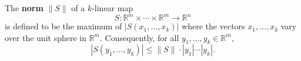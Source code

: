 The \textbf{norm} $\|S\|$ of a $k$-linear map
$$
S: \mathbb{R}^m \times \cdots \times \mathbb{R}^m \to \mathbb{R}^n
$$
is defined to be the maximum of $|S(x_1, \ldots, x_k)|$ where the vectors $x_1, \ldots, x_k$ vary over the unit sphere in $\mathbb{R}^m$. Consequently, for all $y_1, \ldots, y_k \in \mathbb{R}^m$,
$$
|S(y_1, \ldots, y_k)| \leqslant \|S\| \cdot |y_1| \cdots |y_k|.
$$
